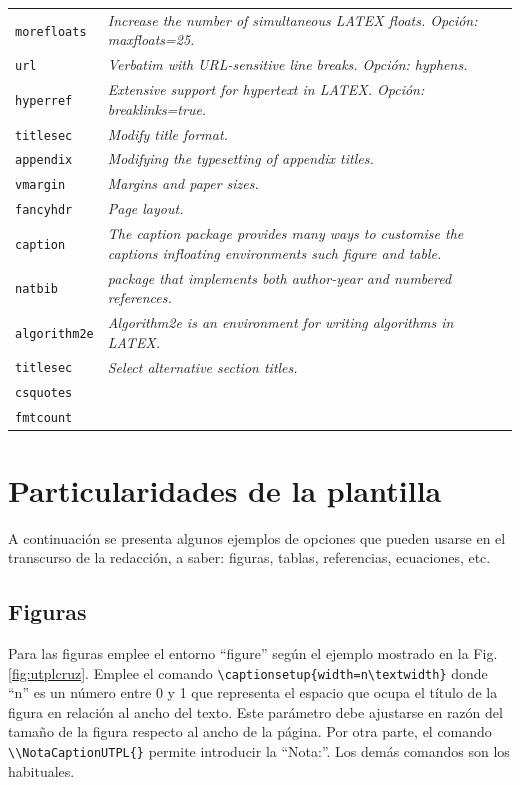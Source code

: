\begin{longtable}{p{} p{}}
	\texttt{morefloats} & \textit{Increase the number of simultaneous LATEX floats. Opción: maxfloats=25.} \\
	\texttt{url} 		& \textit{Verbatim with URL-sensitive line breaks. Opción: hyphens.} \\
	\texttt{hyperref} 	& \textit{Extensive support for hypertext in LATEX. Opción: breaklinks=true.} \\
	\texttt{titlesec} 	& \textit{Modify title format.} \\
	\texttt{appendix}   & \textit{Modifying the typesetting of appendix titles.} \\
	\texttt{vmargin} 	& \textit{Margins and paper sizes.} \\
	\texttt{fancyhdr} 	& \textit{Page layout.}\\
	\texttt{caption} 	& \textit{The caption package provides many ways to customise the captions infloating environments such figure and table.}\\
	\texttt{natbib} 	& \textit{package that implements both author-year and numbered references.} \\
	\texttt{algorithm2e}& \textit{Algorithm2e is an environment for writing algorithms in LATEX.} \\
	\texttt{titlesec}	& \textit{Select alternative section titles.} \\
	\texttt{csquotes}	& \textit{} \\
	\texttt{fmtcount}	& \textit{}
		
\end{longtable} 


\section{Particularidades de la plantilla}

A continuación se presenta algunos ejemplos de opciones que pueden usarse en el transcurso de la redacción, a saber: figuras, tablas, referencias, ecuaciones, etc. 

\subsection{Figuras}

Para las figuras emplee el entorno ``figure'' según el ejemplo mostrado en la Fig. \ref{fig:utplcruz}. Emplee el comando \lstinline|\captionsetup{width=n\textwidth}| donde ``n'' es un número entre 0 y 1 que representa el espacio que ocupa el título de la figura en relación al ancho del texto. Este parámetro debe ajustarse en razón del tamaño de la figura respecto al ancho de la página. Por otra parte, el comando \lstinline|\\NotaCaptionUTPL{}| permite introducir la ``Nota:''. Los demás comandos son los habituales. 

